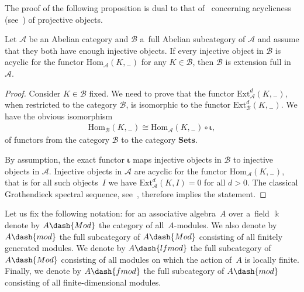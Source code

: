 \documentclass[pdftex]{sigma}
\begin{document}
The proof of the following proposition is dual to that of~\cite[Corollary~5]{CoMa} concerning acyclicness
(see~\cite[Subsection~2.4.3]{We}) of projective objects.
\begin{proposition}
\label{propinj}
Let $\mathcal{A}$ be an Abelian category and $\mathcal{B}$ a~full Abelian subcategory of $\mathcal{A}$ and assume that
they both have enough injective objects.
If every injective object in $\mathcal{B}$ is acyclic for the functor $\mathrm{Hom}_{\mathcal{A}}(K,{}_-)$ for any
$K\in\mathcal{B}$, then $\mathcal{B}$ is extension full in $\mathcal{A}$.
\end{proposition}
\begin{proof}
Consider $K\in\mathcal{B}$ f\/ixed.
We need to prove that the functor $\mathrm{Ext}^d_{\mathcal{A}}(K,{}_-)$, when restricted to the category $\mathcal{B}$,
is isomorphic to the functor $\mathrm{Ext}^d_{\mathcal{B}}(K,{}_-)$.
We have the obvious isomorphism
\begin{gather*}
\mathrm{Hom}_{\mathcal{B}}(K,{}_-)\cong\mathrm{Hom}_{\mathcal{A}}(K,{}_-)\circ \boldsymbol{\iota},
\end{gather*}
of functors from the category $\mathcal{B}$ to the category $\mathbf{Sets}$.

By assumption, the exact functor $\boldsymbol{\iota}$ maps injective objects in $\mathcal{B}$ to injective objects in
$\mathcal{A}$.
Injective objects in $\mathcal{A}$ are acyclic for the functor $\mathrm{Hom}_{\mathcal{A}}(K,{}_-)$, that is for all
such objects~$I$ we have $\mathrm{Ext}_{\mathcal{A}}^{d}(K,I)=0$ for all $d>0$.
The classical Grothendieck spectral sequence, see~\cite[Section~5.8]{We}, therefore implies the statement.
\end{proof}

Let us f\/ix the following notation: for an associative algebra~$A$ over a~f\/ield $\Bbbk$ denote by $A\dash{Mod}$ the
category of all~$A$-modules.
We also denote by $A\dash{mod}$ the full subcategory of $A\dash{Mod}$ consisting of all f\/initely generated modules.
We denote by $A\dash{lfmod}$ the full subcategory of $A\dash{Mod}$ consisting of all modules on which the action of~$A$
is locally f\/inite.
Finally, we denote by $A\dash{fmod}$ the full subcategory of $A\dash{mod}$ consisting of all f\/inite-dimensional modules.
\end{document}
